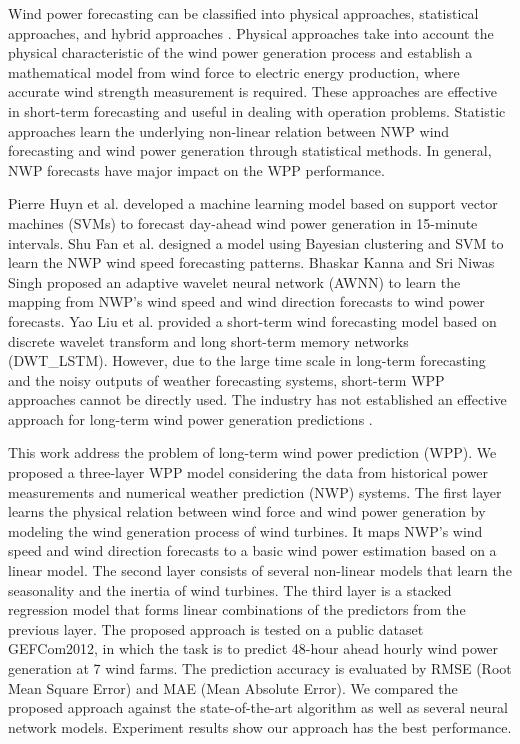 \documentclass[conference]{IEEEtran}
\begin{document}
Wind power forecasting can be classified into physical approaches, statistical approaches, and hybrid approaches \cite{LI201356,Gao2016DistributedMF,Alencar17}. Physical approaches take into account the physical characteristic of the wind power generation process and establish a mathematical model from wind force to electric energy production, where accurate wind strength measurement is required. These approaches are effective in short-term forecasting and useful in dealing with operation problems. Statistic approaches learn the underlying non-linear relation between NWP wind forecasting and wind power generation through statistical methods. In general, NWP forecasts have major impact on the WPP performance. 

Pierre Huyn et al. \cite{Pierre17} developed a machine learning model based on support vector machines (SVMs) to forecast day-ahead wind power generation in 15-minute intervals. Shu Fan et al. \cite{4757294} designed a model using Bayesian clustering and SVM to learn the NWP wind speed forecasting patterns. Bhaskar Kanna and Sri Niwas Singh \cite{7894735} proposed an adaptive wavelet neural network (AWNN) to learn the mapping from NWP’s wind speed and wind direction forecasts to wind power forecasts. Yao Liu et al. \cite{app9061108} provided a short-term wind forecasting model based on discrete wavelet transform and long short-term memory networks (DWT\_LSTM). However, due to the large time scale in long-term forecasting and the noisy outputs of weather forecasting systems, short-term WPP approaches cannot be directly used. The industry has not established an effective approach for long-term wind power generation predictions \cite{HAN2019181}. 

This work address the problem of long-term wind power prediction (WPP). We proposed a three-layer WPP model considering the data from historical power measurements and numerical weather prediction (NWP) systems. The first layer learns the physical relation between wind force and wind power generation by modeling the wind generation process of wind turbines. It maps NWP’s wind speed and wind direction forecasts to a basic wind power estimation based on a linear model. The second layer consists of several non-linear models that learn the seasonality and the inertia of wind turbines. The third layer is a stacked regression model that forms linear combinations of the predictors from the previous layer. The proposed approach is tested on a public dataset GEFCom2012, in which the task is to predict 48-hour ahead hourly wind power generation at 7 wind farms. The prediction accuracy is evaluated by RMSE (Root Mean Square Error) and MAE (Mean Absolute Error). We compared the proposed approach against the state-of-the-art algorithm as well as several neural network models. Experiment results show our approach has the best performance. 
\end{document}
